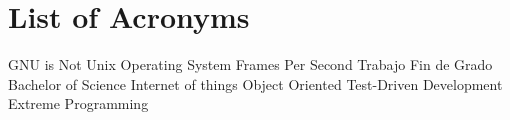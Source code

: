 \chapter{List of Acronyms} %

{\small
\begin{acronym}[XXXXXXXX]
	     	{\acs{GNU} is Not Unix}
			{Operating System}
			{Frames Per Second}
			{Trabajo Fin de Grado}
			{Bachelor of Science}
			{Internet of things}
			{Object Oriented}
			{Test-Driven Development}
			{Extreme Programming}
\end{acronym}
}




